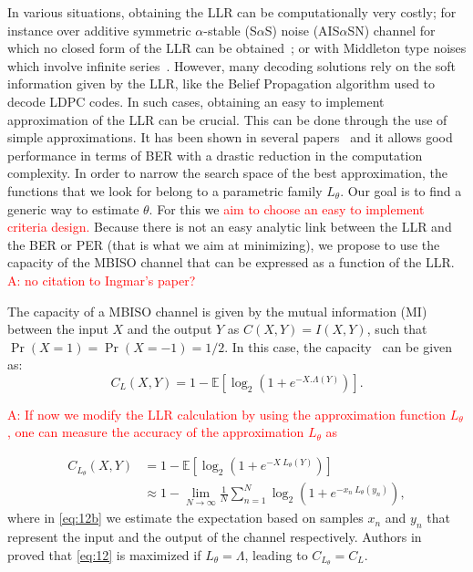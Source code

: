 \documentclass[a4paper]{IEEEtran}
\begin{document}
In various situations, obtaining the LLR can be
computationally very costly; for instance over additive
symmetric $\alpha$-stable (S$\alpha$S) noise (AIS$\alpha$SN)
channel for which no closed form of the LLR can be
obtained~\cite{PM-2010-1}; or with Middleton type noises
which involve infinite series~\cite{Middleton1977}. However,
many decoding solutions rely on the soft information given
by the LLR, like the Belief Propagation algorithm used to
decode LDPC codes. In such cases, obtaining an easy to
implement approximation of the LLR can be crucial. This can
be done through the use of simple approximations. It has
been shown in several papers~\cite{VALG-2014, YRL-2014,
  CRB-2017} and it allows good performance in terms of BER
with a drastic reduction in the computation complexity. In
order to narrow the search space of the best approximation,
the functions that we look for belong to a parametric family
$L_\theta$. Our goal is to find a generic way to estimate
$\theta$. For this we \textcolor{red}{aim to choose an easy
  to implement criteria design.} Because there is not an
easy analytic link between the LLR and the BER or PER (that
is what we aim at minimizing), we propose to use the
capacity of the MBISO channel that can be expressed as
a function of the LLR. \textcolor{red}{A: no citation to
  Ingmar's paper?}




The capacity of a MBISO channel is given by the mutual
information (MI) between the input $X$ and the output $Y$ as
$C(X,Y)=I(X, Y)$, such that $\Pr(X=1)=\Pr(X=-1)=1/2$. In
this case, the capacity~\cite{RU-2008} can be given as:
\begin{equation}
   \label{eq:11}
   C_L(X,Y) = 1- \mathbb{E}\left[\log_2\left(1+e^{-X.%
         \Lambda(Y)}\right)\right].
\end{equation}

\textcolor{red}{A: If now we modify the LLR calculation by
  using the approximation function $L_\theta$, one can
  measure the accuracy of the approximation $L_\theta$ as}

\begin{align}
  C_{L_\theta}(X,Y)
  & = 1-\mathbb{E}\left[\log_2(1+e^{-X\:L_\theta(Y)})\right] \label{eq:12}\\
  &\approx 1-\lim_{N\to\infty}\frac1N\sum_{n=1}^N\log_2\left(1+e^{-x_n\:L_\theta(y_n)}\right),\label{eq:12b}
\end{align}
where in \eqref{eq:12b} we estimate the expectation based on
samples $x_n$ and $y_n$ that represent the input and the
output of the channel respectively. Authors
in~\cite{YA-2009} proved that \eqref{eq:12} is maximized if
$L_\theta=\Lambda$, leading to $C_{L_\theta}= C_L$.
\end{document}
